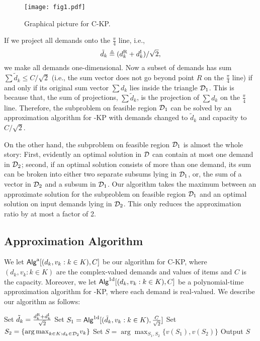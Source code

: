 \documentclass{aamas2013}
\begin{document}
\begin{figure}[htb!]
 \centering 
 \texttt{[image: fig1.pdf]} \caption{Graphical picture for C-KP.} \label{fig:fig1}
\end{figure}



If we project all demands onto the $\frac{\pi}{4}$ line, i.e., 
\begin{equation*}
\tilde{d}_k \triangleq (d_k^{\rm R}+d_k^{\rm I})/\sqrt{2},
\end{equation*}
we make all demands one-dimensional.  Now a subset of demands has sum $\sum \tilde{d}_k \le  C/\sqrt{2}$ (i.e., the sum vector does not go beyond point $R$ on the $\frac{\pi}{4}$ line) if and only if its original sum vector $\sum d_k$ lies inside the triangle ${\cal D}_1$.  This is because that, the sum of projections, $\sum \tilde{d}_k$, is the projection of $\sum d_k$ on the $\frac{\pi}{4}$ line.  Therefore, the subproblem on feasible region ${\cal D}_1$ can be solved by an approximation algorithm for {-KP} with demands changed to $\tilde{d}_k$ and capacity to $C/\sqrt{2}$.

On the other hand, the subproblem on feasible region ${\cal D}_1$ is almost the whole story: First, evidently an optimal solution in ${\cal D}$ can contain at most one demand in ${\cal D}_2$; second, if an optimal solution consists of more than one demand, its sum can be broken into either two separate subsums lying in ${\cal D}_1$, or, the sum of a vector in ${\cal D}_2$ and a subsum in ${\cal D}_1$.  Our algorithm takes the maximum between an approximate solution for the subproblem on feasible region ${\cal D}_1$ and an optimal solution on input demands lying in ${\cal D}_2$.  This only reduces the approximation ratio by at most a factor of 2.




\subsection{Approximation Algorithm}
\noindent 
We let ${\sf Alg}^{\rm a} [(d_k,v_k: k \in K), C]$ be our algorithm for {\sc C-KP}, where $(d_k,v_k: k \in K)$ are the complex-valued demands and values of items and $C$ is the capacity. Moreover, we let ${\sf Alg}^{\rm 1d}[(d_k,v_k: k \in K), C]$ be a polynomial-time approximation algorithm for {-KP}, where each demand is real-valued.
We describe our algorithm as follows:

\begin{algorithm}[htb!]
\caption{${\sf Alg}^{\rm a} [(d_k,v_k: k \in K), C]$}
\begin{algorithmic}[1]
\STATE Set $\tilde{d}_k =  \frac{d_k^{\rm R}+d_k^{\rm I}}{\sqrt{2}} $
\ENDFOR
\STATE Set $S_1 = {\sf Alg}^{\rm 1d}[(\tilde{d}_k,v_k: k \in K),\frac{C}{\sqrt{2}}]$
\STATE Set $S_2 = \{\displaystyle {\arg\max}_{k \in K : d_k \in {\cal D}_2  } v_k \}$
\STATE Set $S = \arg\max_{S_1, S_2}\{ v(S_1), v(S_2) \}$
\STATE Output $S$
\end{algorithmic}
\end{algorithm}
\end{document}

